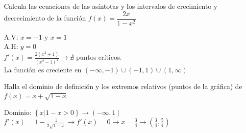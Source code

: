 \documentclass[addpoints,spanish, 12pt,a4paper]{exam}
\begin{document}
\begin{questions}
\question[4] Calcula las ecuaciones de las asíntotas y los intervalos de crecimiento y decrecimiento de la función $f(x)=\dfrac{2x}{1-x^2}$
\begin{solution}
    A.V: $x=-1$ y $x=1$ \\
    A.H: $y=0$ \\
    $f'(x)=\frac{2 \left(x^{2} + 1\right)}{\left(x^{2} - 1\right)^{2}} \to \nexists$ puntos críticos. \\
    La función es creciente en $\left(-\infty, -1\right) \cup \left(-1, 1\right) \cup \left(1, \infty \right)$ 
\end{solution}


\question[3] Halla el dominio de definición y los extremos relativos (puntos de la gráfica) de $f(x)=x+\sqrt{1-x}$
\begin{solution}
    Dominio: $\left\{x| 1-x >0\right\}\to \left(-\infty, 1\right)$ \\
    $f'(x)=1 - \frac{1}{2 \sqrt{1 - x}} \to  f'(x)=0 \to x=\frac{3}{4} \to \left(\frac{3}{4}, \frac{5}{4}\right)$
    
\end{solution}

       

\end{questions}
\end{document}
